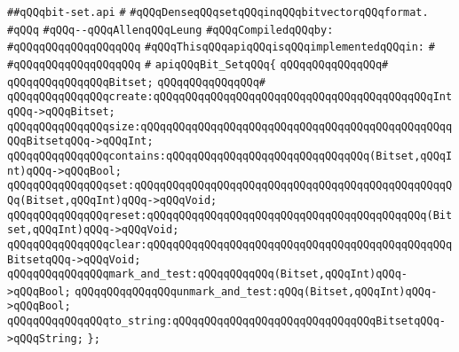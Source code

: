 \label{src/lib/graph/bit-set.api}
\verb|##qQQqbit-set.api|\newline
\verb|#|\newline
\verb|#qQQqDenseqQQqsetqQQqinqQQqbitvectorqQQqformat.|\newline
\verb|#qQQq|\newline
\verb|#qQQq--qQQqAllenqQQqLeung|\newline
\newline
\verb|#qQQqCompiledqQQqby:|\newline
\verb|#qQQqqQQqqQQqqQQqqQQq|\newline
\newline
\verb|#qQQqThisqQQqapiqQQqisqQQqimplementedqQQqin:|\newline
\verb|#|\newline
\verb|#qQQqqQQqqQQqqQQqqQQq|\newline
\verb|#|\newline
\verb|apiqQQqBit_SetqQQq{|\newline
\verb|qQQqqQQqqQQqqQQq#|\newline
\verb|qQQqqQQqqQQqqQQqBitset;|\newline
\verb|qQQqqQQqqQQqqQQq#|\newline
\verb|qQQqqQQqqQQqqQQqcreate:qQQqqQQqqQQqqQQqqQQqqQQqqQQqqQQqqQQqqQQqqQQqIntqQQq->qQQqBitset;|\newline
\verb|qQQqqQQqqQQqqQQqsize:qQQqqQQqqQQqqQQqqQQqqQQqqQQqqQQqqQQqqQQqqQQqqQQqqQQqBitsetqQQq->qQQqInt;|\newline
\verb|qQQqqQQqqQQqqQQqcontains:qQQqqQQqqQQqqQQqqQQqqQQqqQQqqQQq(Bitset,qQQqInt)qQQq->qQQqBool;|\newline
\verb|qQQqqQQqqQQqqQQqset:qQQqqQQqqQQqqQQqqQQqqQQqqQQqqQQqqQQqqQQqqQQqqQQqqQQq(Bitset,qQQqInt)qQQq->qQQqVoid;|\newline
\verb|qQQqqQQqqQQqqQQqreset:qQQqqQQqqQQqqQQqqQQqqQQqqQQqqQQqqQQqqQQqqQQq(Bitset,qQQqInt)qQQq->qQQqVoid;|\newline
\verb|qQQqqQQqqQQqqQQqclear:qQQqqQQqqQQqqQQqqQQqqQQqqQQqqQQqqQQqqQQqqQQqqQQqBitsetqQQq->qQQqVoid;|\newline
\verb|qQQqqQQqqQQqqQQqmark_and_test:qQQqqQQqqQQq(Bitset,qQQqInt)qQQq->qQQqBool;|\newline
\verb|qQQqqQQqqQQqqQQqunmark_and_test:qQQq(Bitset,qQQqInt)qQQq->qQQqBool;|\newline
\verb|qQQqqQQqqQQqqQQqto_string:qQQqqQQqqQQqqQQqqQQqqQQqqQQqqQQqBitsetqQQq->qQQqString;|\newline
\verb|};|\newline
\newline

